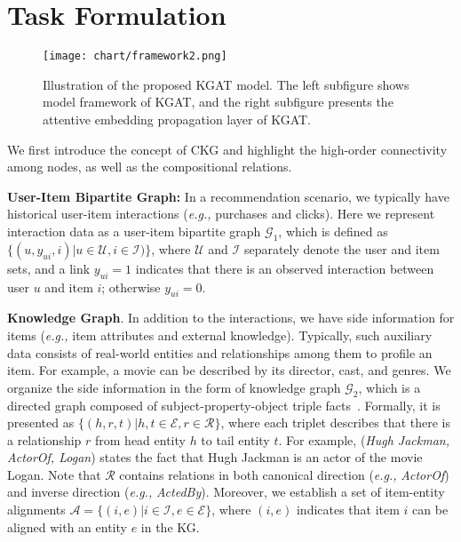 \documentclass[sigconf]{acmart}
\newcommand{\Set}[1]{\mathcal{#1}}
\newcommand{\eg}{\emph{e.g., }}
\theoremstyle{definition}
\begin{document}
 \section{Task Formulation}

\begin{figure*}[ht]
    \centering
	\texttt{[image: chart/framework2.png]}
	\vspace{-10pt}
	\caption{Illustration of the proposed KGAT model. The left subfigure shows model framework of KGAT, and the right subfigure presents the attentive embedding propagation layer of KGAT.}
	\label{fig:framework}
	\vspace{-10pt}
\end{figure*}

We first introduce the concept of CKG and highlight the high-order connectivity among nodes, as well as the compositional relations.


\vspace{5px}
\noindent\textbf{User-Item Bipartite Graph:}
In a recommendation scenario, we typically have historical user-item interactions (\eg purchases and clicks).
Here we represent interaction data as a user-item bipartite graph $\Set{G}_1$, which is defined as $\{(u,y_{ui},i)|u\in\Set{U},i\in\Set{I})\}$, where $\Set{U}$ and $\Set{I}$ separately denote the user and item sets, and a link $y_{ui}=1$ indicates that there is an observed interaction between user $u$ and item $i$; otherwise $y_{ui}=0$.

\vspace{5px}
\noindent\textbf{Knowledge Graph}.
In addition to the interactions, we have side information for items (\eg item attributes and external knowledge).
Typically, such auxiliary data consists of real-world entities and relationships among them to profile an item.
For example, a movie can be described by its director, cast, and genres.
We organize the side information in the form of knowledge graph $\Set{G}_2$, which is a directed graph composed of subject-property-object triple facts~\cite{KTUP}.
Formally, it is presented as $\{(h,r,t)|h,t\in\Set{E},r\in\Set{R}\}$, where each triplet describes that there is a relationship $r$ from head entity $h$ to tail entity $t$.
For example, (\emph{Hugh Jackman, ActorOf, Logan}) states the fact that Hugh Jackman is an actor of the movie Logan.
Note that $\Set{R}$ contains relations in both canonical direction (\eg \emph{ActorOf}) and inverse direction (\eg \emph{ActedBy}).
Moreover, we establish a set of item-entity alignments $\Set{A}=\{(i,e)|i\in\Set{I},e\in\Set{E}\}$, where $(i,e)$ indicates that item $i$ can be aligned with an entity $e$ in the KG.
\end{document}

